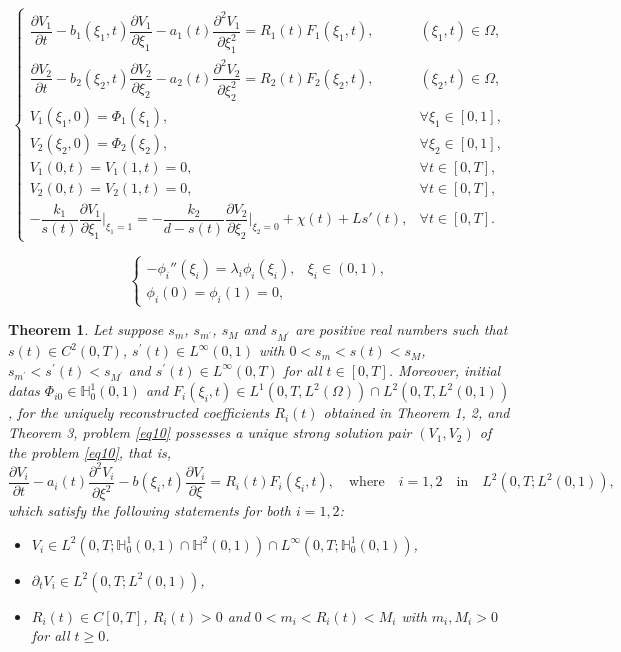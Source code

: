 \documentclass[10pt,a4paper]{amsart}
\newtheorem{theorem}{Theorem}
\begin{document}
\begin{equation}\label{eq10}
    \begin{cases}
        \dfrac{\partial V_1}{\partial t}-b_1(\xi_1,t)\dfrac{\partial V_1}{\partial \xi_1}-a_1(t)\dfrac{\partial^2 V_1}{\partial\xi_1^2}=R_1(t)F_1(\xi_1,t),& (\xi_1,t)\in\Omega,\\
        \dfrac{\partial V_2}{\partial t}-b_2(\xi_2,t)\dfrac{\partial V_2}{\partial \xi_2}-a_2(t)\dfrac{\partial^2 V_2}{\partial\xi_2^2}=R_2(t)F_2(\xi_2,t),& (\xi_2,t)\in\Omega,\\
        V_1(\xi_1,0)=\Phi_1(\xi_1),&\forall\xi_1\in[0,1],\\
        V_2(\xi_2,0)=\Phi_2(\xi_2),&\forall\xi_2\in[0,1],\\
        V_1(0,t)=V_1(1,t)=0,&\forall t\in[0,T],\\
        V_2(0,t)=V_2(1,t)=0,&\forall t\in[0,T],\\
        -\dfrac{k_1}{s(t)}\dfrac{\partial V_1}{\partial \xi_1}\bigg|_{\xi_1=1}=-\dfrac{k_2}{d-s(t)}\dfrac{\partial V_2}{\partial\xi_2}\bigg|_{\xi_2=0}+\chi(t)+Ls'(t),& \forall t\in[0,T].
    \end{cases}
\end{equation}

\begin{equation}\label{eq11}
    \begin{cases}
        -\phi_i''(\xi_i)=\lambda_i\phi_i(\xi_i),&\xi_i\in(0,1),\\
        \phi_i(0)=\phi_i(1)=0,
    \end{cases}
\end{equation}

\begin{theorem}\label{thm4}
Let suppose $s_m$, $s_{m^{\prime}}$, $s_M$ and $s_{M^{\prime}}$ are positive real numbers such that $s(t)\in C^2(0,T)$, $s^{\prime}(t)\in L^{\infty}(0,1)$ with $0<s_m<s(t)<s_M$, $s_{m^{\prime}}<s^{\prime}(t)<s_{M^{\prime}}$ and $s^{\prime}(t)\in L^{\infty}(0,T)$ for all $t\in[0,T]$. Moreover, initial datas $\Phi_{i0}\in \mathbb{H}_0^1(0,1)$ and $F_i(\xi_i,t)\in L^1(0,T,L^2(\Omega))\cap L^2(0,T,L^2(0,1))$, for the uniquely reconstructed coefficients $R_i(t)$ obtained in Theorem 1, 2, and Theorem 3, problem \eqref{eq10} possesses a unique strong solution pair $(V_1,V_2)$ of the problem \eqref{eq10}, that is,
$$\frac{\partial V_i}{\partial t}-a_i(t)\frac{\partial^2 V_i}{\partial \xi^2}-b(\xi_i,t)\frac{\partial V_i}{\partial \xi}=R_i(t)F_i(\xi_i,t),\quad\text{where}\quad i=1,2\quad\text{in}\quad L^2(0,T;L^2(0,1)),$$ which satisfy the following statements for both $i=1,2$:
\begin{itemize}
    \item[a)] $V_i\in L^2(0,T;\mathbb{H}_0^1(0,1)\cap \mathbb{H}^2(0,1))\cap L^{\infty}(0,T;\mathbb{H}_0^1(0,1))$,
    \item[b)] $\partial_t V_i\in L^2(0,T;L^2(0,1))$,
    \item[c)] $R_i(t)\in C[0,T]$, $R_i(t)>0$ and $0<m_i<R_i(t)< M_i$ with $m_i,M_i>0$ for all $t\geq 0$. 
\end{itemize}
\end{theorem}
\end{document}
